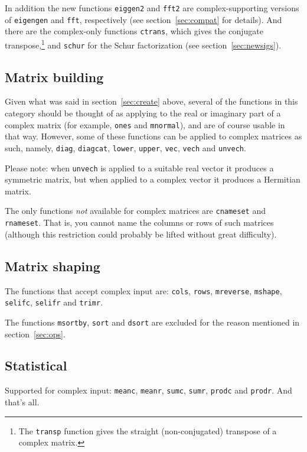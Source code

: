 \documentclass{article}
\begin{document}
In addition the new functions \texttt{eiggen2} and \texttt{fft2} are
complex-supporting versions of \texttt{eigengen} and \texttt{fft},
respectively (see section~\ref{sec:compat} for details). And there are
the complex-only functions \texttt{ctrans}, which gives the conjugate
transpose,\footnote{The \texttt{transp} function gives the straight
  (non-conjugated) transpose of a complex matrix.} and \texttt{schur}
for the Schur factorization (see section~\ref{sec:newsigs}).

\subsection{Matrix building}

Given what was said in section~\ref{sec:create} above, several of the
functions in this category should be thought of as applying to the
real or imaginary part of a complex matrix (for example, \texttt{ones}
and \texttt{mnormal}), and are of course usable in that way.  However,
some of these functions can be applied to complex matrices as such,
namely, \texttt{diag}, \texttt{diagcat}, \texttt{lower},
\texttt{upper}, \texttt{vec}, \texttt{vech} and \texttt{unvech}.

Please note: when \texttt{unvech} is applied to a suitable real
vector it produces a symmetric matrix, but when applied to a complex
vector it produces a Hermitian matrix.

The only functions \textit{not} available for complex matrices are
\texttt{cnameset} and \texttt{rnameset}. That is, you cannot name the
columns or rows of such matrices (although this restriction could
probably be lifted without great difficulty).

\subsection{Matrix shaping}

The functions that accept complex input are: \texttt{cols},
\texttt{rows}, \texttt{mreverse}, \texttt{mshape}, \texttt{selifc},
\texttt{selifr} and \texttt{trimr}.

The functions \texttt{msortby}, \texttt{sort} and \texttt{dsort} are
excluded for the reason mentioned in section~\ref{sec:ops}.

\subsection{Statistical}

Supported for complex input: \texttt{meanc}, \texttt{meanr},
\texttt{sumc}, \texttt{sumr}, \texttt{prodc} and \texttt{prodr}. And
that's all.
\end{document}
